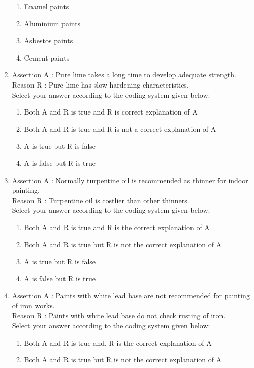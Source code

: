 \documentclass[11pt,a4paper]{article}
\begin{document}
\begin{enumerate}
\begin{enumerate}[label=\Alph*.]
\item{Enamel paints}
\item{Aluminium paints}
\item{Asbestos paints}
\item{Cement paints}
\end{enumerate}
\item{Assertion A : Pure lime takes a long time to develop adequate strength. \\
Reason R : Pure lime has slow hardening characteristics. \\
Select your answer according to the coding system given below:}
\begin{enumerate}[label=\Alph*.]
\item{Both A and R is true and R is correct explanation of A}
\item{Both A and R is true and R is not a correct explanation of A}
\item{A is true but R is false}
\item{A is false but R is true}
\end{enumerate}
\item{Assertion A : Normally turpentine oil is recommended as thinner for indoor painting. \\
Reason R : Turpentine oil is costlier than other thinners. \\
Select your answer according to the coding system given below:}
\begin{enumerate}[label=\Alph*.]
\item{Both A and R is true and R is the correct explanation of A}
\item{Both A and R is true but R is not the correct explanation of A}
\item{A is true but R is false}
\item{A is false but R is true}
\end{enumerate}
\item{Assertion A : Paints with white lead base are not recommended for painting of iron works. \\
Reason R : Paints with white lead base do not check rusting of iron. \\
Select your answer according to the coding system given below:}
\begin{enumerate}[label=\Alph*.]
\item{Both A and R is true and, R is the correct explanation of A}
\item{Both A and R is true but R is not the correct explanation of A}

\end{enumerate}
\end{enumerate}
\end{document}
